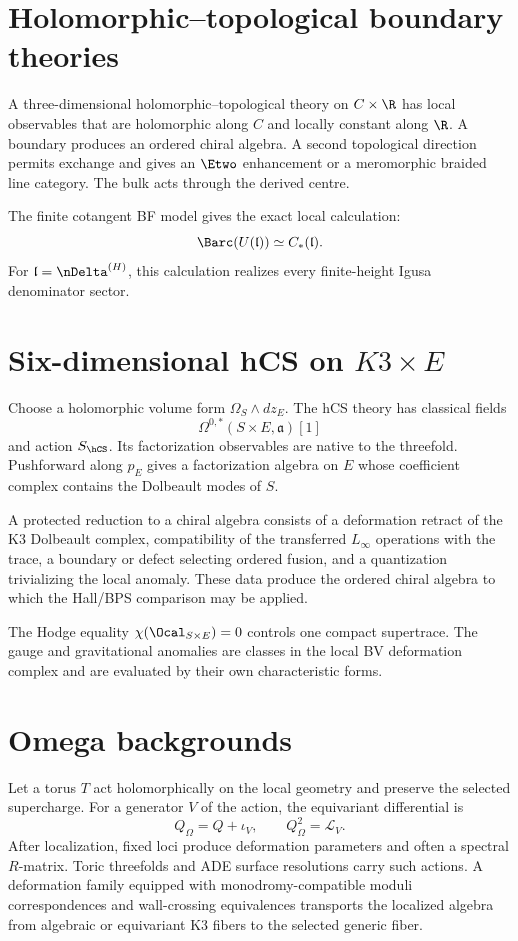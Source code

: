 \chapter{Holomorphic--topological boundary theories}
A three-dimensional holomorphic--topological theory on $C\times\R$ has local observables that are holomorphic along $C$ and locally constant along $\R$. A boundary produces an ordered chiral algebra. A second topological direction permits exchange and gives an $\Etwo$ enhancement or a meromorphic braided line category. The bulk acts through the derived centre.

The finite cotangent BF model gives the exact local calculation:
\[
 \Barc(U(\mathfrak l))\simeq C_*(\mathfrak l).
\]
For $\mathfrak l=\nDelta^{(H)}$, this calculation realizes every finite-height Igusa denominator sector.

\chapter{Six-dimensional hCS on \texorpdfstring{$K3\times E$}{K3 x E}}
Choose a holomorphic volume form $\Omega_S\wedge dz_E$. The hCS theory has classical fields
\[
 \Omega^{0,*}(S\times E,\mathfrak a)[1]
\]
and action $S_{\hCS}$. Its factorization observables are native to the threefold. Pushforward along $p_E$ gives a factorization algebra on $E$ whose coefficient complex contains the Dolbeault modes of $S$.

A protected reduction to a chiral algebra consists of a deformation retract of the K3 Dolbeault complex, compatibility of the transferred $L_\infty$ operations with the trace, a boundary or defect selecting ordered fusion, and a quantization trivializing the local anomaly. These data produce the ordered chiral algebra to which the Hall/BPS comparison may be applied.

The Hodge equality $\chi(\Ocal_{S\times E})=0$ controls one compact supertrace. The gauge and gravitational anomalies are classes in the local BV deformation complex and are evaluated by their own characteristic forms.

\chapter{Omega backgrounds}
Let a torus $T$ act holomorphically on the local geometry and preserve the selected supercharge. For a generator $V$ of the action, the equivariant differential is
\[
 Q_\Omega=Q+\iota_V,
 \qquad Q_\Omega^2=\mathcal L_V.
\]
After localization, fixed loci produce deformation parameters and often a spectral $R$-matrix. Toric threefolds and ADE surface resolutions carry such actions. A deformation family equipped with monodromy-compatible moduli correspondences and wall-crossing equivalences transports the localized algebra from algebraic or equivariant K3 fibers to the selected generic fiber.

